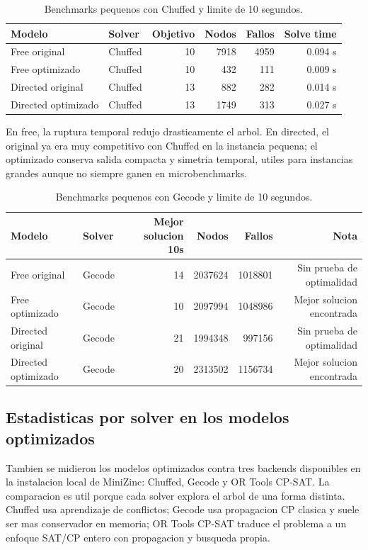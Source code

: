 \documentclass[11pt,a4paper]{article}
\begin{document}
\begin{table}[h]
\centering
\begin{tabular}{llrrrr}
\toprule
Modelo & Solver & Objetivo & Nodos & Fallos & Solve time \\
\midrule
Free original & Chuffed & 10 & 7918 & 4959 & 0.094 s \\
Free optimizado & Chuffed & 10 & 432 & 111 & 0.009 s \\
Directed original & Chuffed & 13 & 882 & 282 & 0.014 s \\
Directed optimizado & Chuffed & 13 & 1749 & 313 & 0.027 s \\
\bottomrule
\end{tabular}
\caption{Benchmarks pequenos con Chuffed y limite de 10 segundos.}
\end{table}

En free, la ruptura temporal redujo drasticamente el arbol. En directed, el original ya era muy competitivo con Chuffed en la instancia pequena; el optimizado conserva salida compacta y simetria temporal, utiles para instancias grandes aunque no siempre ganen en microbenchmarks.

\begin{table}[h]
\centering
\begin{tabular}{llrrrr}
\toprule
Modelo & Solver & Mejor solucion 10s & Nodos & Fallos & Nota \\
\midrule
Free original & Gecode & 14 & 2037624 & 1018801 & Sin prueba de optimalidad \\
Free optimizado & Gecode & 10 & 2097994 & 1048986 & Mejor solucion encontrada \\
Directed original & Gecode & 21 & 1994348 & 997156 & Sin prueba de optimalidad \\
Directed optimizado & Gecode & 20 & 2313502 & 1156734 & Mejor solucion encontrada \\
\bottomrule
\end{tabular}
\caption{Benchmarks pequenos con Gecode y limite de 10 segundos.}
\end{table}

\subsection{Estadisticas por solver en los modelos optimizados}
Tambien se midieron los modelos optimizados contra tres backends disponibles en la instalacion local de MiniZinc: Chuffed, Gecode y OR Tools CP-SAT. La comparacion es util porque cada solver explora el arbol de una forma distinta. Chuffed usa aprendizaje de conflictos; Gecode usa propagacion CP clasica y suele ser mas conservador en memoria; OR Tools CP-SAT traduce el problema a un enfoque SAT/CP entero con propagacion y busqueda propia.
\end{document}
